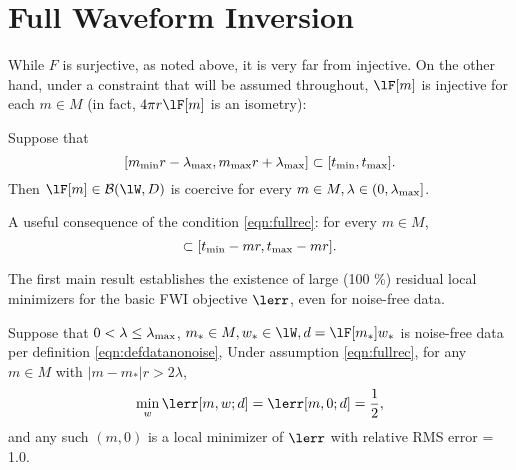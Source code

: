 \section{Full Waveform Inversion}
While $F$ is surjective, as noted above, it is
very far from injective. On the other hand, under a constraint that
will be assumed throughout, $\lF[m]$ is injective for each $m \in M$ (in fact, $4 \pi r
\lF[m]$ is an isometry):
\begin{proposition}
  \label{thm:fullrec}
  Suppose that 
  \begin{equation}
    \label{eqn:fullrec}
    [ m_{\rm min}r-\lambda_{\rm max}, m_{\rm max}r+\lambda_{\rm max}]
    \subset [t_{\rm min},t_{\rm max}].
  \end{equation}
  Then $\lF[m]\in {\cal B}(\lW,D)$ is coercive for every $m \in M, \lambda \in
  (0,\lambda_{\rm max}]$.
\end{proposition}

 A useful consequence of the condition 
\ref{eqn:fullrec}: for every $m \in M$, 
\begin{equation}
  [-\lambda_{\rm max}, -\lambda_{\rm max}] \subset[ t_{\rm min}-mr , 
  t_{\rm max}-mr]. 
  \label{eqn:zeroinc}
\end{equation}

The first main result establishes the existence of large (100 \%)
residual local minimizers for the basic FWI objective $\lerr$, even
for noise-free data.
\begin{theorem}
  \label{thm:fwi}
  Suppose that $0 <\lambda\le \lambda_{\rm max}$,  $m_* \in M, w_*
  \in \lW, d=\lF[m_*]w_*$ is noise-free data per definition \ref{eqn:defdatanonoise},
  Under assumption \ref{eqn:fullrec}, for any $m \in M$ with $|m-m_*|r>2\lambda$,
\begin{equation}
  \label{eqn:isovpm}
 \min_w \lerr[m,w;d]=\lerr[m,0;d] = \frac{1}{2},
\end{equation}
and any such $(m,0)$ is a local minimizer of $\lerr$ with relative RMS
error = 1.0.
\end{theorem}

